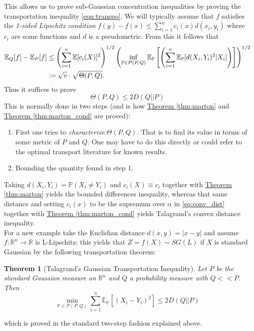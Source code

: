 \documentclass[reqno]{amsproc}
\newtheorem{theorem}{Theorem}
\newcommand{\fref}[2]{\hyperref[#2]{#1 \ref*{#2}}}
\newcommand{\defeq}{\vcentcolon=} %
\newcommand{\R}{\mathbb{R}}
\renewcommand{\P}{\mathbb{P}} %
\newcommand{\E}{\mathbb{E}} %
\begin{document}
	This allows us to prove sub-Gaussian concentration inequalities by proving the transportation inequality \eqref{eqn:transpo}.
	We will typically assume that $f$ satisfies the \textit{1-sided Lipschitz condition}
	$f(y) - f(x) \leq \sum\limits_{i=1}^n c_i(x)d(x_i,y_i)$ where $c_i$ are some functions and $d$ is a pseudometric. From this it follows that 
	\begin{align*}
		\E_Q[f] - \E_P[f] &\leq \left(\sum\limits_{i=1}^n \E[c_i(X)]^2\right)^{1/2}
		\left(\inf\limits_{\P \in \mathcal{P}(P,Q)} \E_{\P}\left[\left(\sum\limits_{i=1}^n \E_{\P}[d(X_i,Y_i)^2|X_i]\right)\right]\right)^{1/2}\\
		&\defeq \sqrt{v}\cdot \sqrt{\Theta(P,Q)}.
	\end{align*}
	Thus it suffices to prove
	$$\Theta(P,Q) \leq 2D(Q||P)$$
	This is normally done in two steps (and is how \fref{Theorem}{thm:marton} and \fref{Theorem}{thm:marton_cond} are proved):
	\begin{enumerate}
		\item	First one tries to \textit{characterize} $\Theta(P,Q)$. That is to find its value in terms of some metric of $P$ and $Q$. 
			One may have to do this directly or could refer to the optimal transport literature for known results.
		\item	Bounding the quantity found in step 1.
	\end{enumerate}
	Taking $d(X_i,Y_i) = \P(X_i \ne Y_i)$ and $c_i(X) \equiv c_i$ together with \fref{Theorem}{thm:marton} yields the bounded differences inequality,
	whereas that same distance and setting $c_i(x)$ to be the supremum over $\alpha$ in \eqref{eq:conv_dist}
	together with \fref{Theorem}{thm:marton_cond} yields Talagrand's convex distance inequality. \\

	For a new example take the Euclidian distance $d(x,y) = |x-y|$ and assume $f: \R^n \to \R$ is L-Lipschitz;
	this yields that $Z = f(X) \sim SG(L)$ if $X$ is standard Gaussian by the following transportation theorem:
	\begin{theorem}[Talagrand's Gaussian Transportation Inequality]
		\label{thm:transp_gaussian}
		Let $P$ be the standard Gaussian measure on $\R^n$ and $Q$ a probability measure with $Q << P$. Then 
		$$\min\limits_{\P \in \mathcal{P}(P,Q)} \sum\limits_{i=1}^n \E_{\P}[(X_i-Y_i)^2] \leq 2 D(Q||P)$$
	\end{theorem}
	which is proved in the standard two-step fashion explained above.

\end{document}
